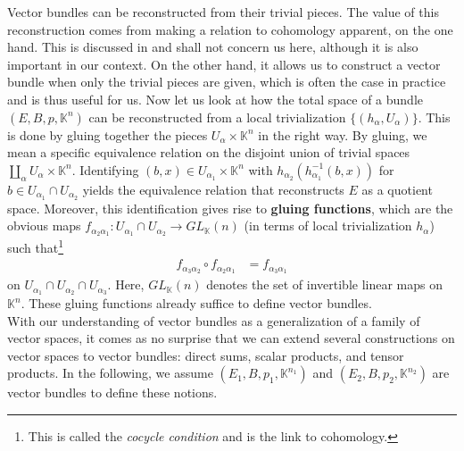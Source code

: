 Vector bundles can be reconstructed from their trivial pieces.
The value of this reconstruction comes from making a relation to cohomology apparent, on the one hand.
This is discussed in \cite{catctxphy} and shall not concern us here, although it is also important in our context.
On the other hand, it allows us to construct a vector bundle when only the trivial pieces are given, which is often the case in practice and is thus useful for us.
Now let us look at how the total space of a bundle $(E,B,p,\mathbb{K}^{n})$ can be reconstructed from a local trivialization $\lbrace (h_{\alpha},U_{\alpha}) \rbrace$.
This is done by {\glqq}gluing together{\grqq} the pieces $U_{\alpha} \times \mathbb{K}^{n}$ in the right way.
By gluing, we mean a specific equivalence relation on the disjoint union of trivial spaces $\coprod_{\alpha}U_{\alpha} \times \mathbb{K}^{n}$.
Identifying $(b,x) \in U_{\alpha_{1}} \times \mathbb{K}^{n}$ with $h_{\alpha_{2}}(h_{\alpha_{1}}^{-1}(b,x))$ for $b \in U_{\alpha_{1}} \cap U_{\alpha_{2}}$ yields the equivalence relation that reconstructs $E$ as a quotient space.
Moreover, this identification gives rise to \textbf{gluing functions}, which are the obvious maps $f_{\alpha_{2}\alpha_{1}} \colon U_{\alpha_{1}} \cap U_{\alpha_{2}} \to GL_{\mathbb{K}}(n)$ (in terms of local trivialization $h_{\alpha}$) such that\footnote{This is called the \textit{cocycle condition} and is the link to cohomology.}
\begin{align*}
  f_{\alpha_{3}\alpha_{2}}
  \circ
  f_{\alpha_{2}\alpha_{1}}
  &=
  f_{\alpha_{3}\alpha_{1}}
\end{align*}
on $U_{\alpha_{1}} \cap U_{\alpha_{2}} \cap U_{\alpha_{3}}$.
Here, $GL_{\mathbb{K}}(n)$ denotes the set of invertible linear maps on $\mathbb{K}^{n}$.
These gluing functions already suffice to define vector bundles.
\\
With our understanding of vector bundles as a generalization of a family of vector spaces, it comes as no surprise that we can extend several constructions on vector spaces to vector bundles: direct sums, scalar products, and tensor products.
In the following, we assume $(E_{1},B,p_{1},\mathbb{K}^{n_{1}})$ and $(E_{2},B,p_{2},\mathbb{K}^{n_{2}})$ are vector bundles to define these notions.
